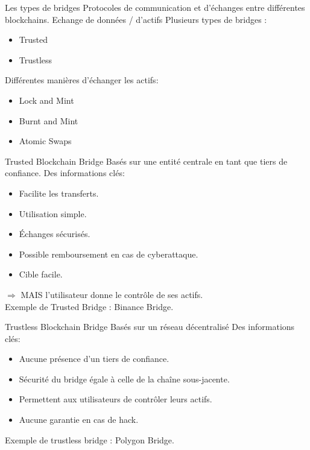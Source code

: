 \begin{frame}{Les types de bridges}
 Protocoles de communication et d'échanges entre différentes blockchains.
 Echange de données / d'actifs \newline \newline
 Plusieurs types de bridges :
 \begin{itemize}
     \item Trusted
     \item Trustless
 \end{itemize} 
 Différentes manières d'échanger les actifs:
 \begin{itemize}
     \item Lock and Mint
     \item Burnt and Mint
     \item Atomic Swaps
 \end{itemize}
\end{frame}

\begin{frame}{Trusted Blockchain Bridge}
    Basés sur une entité centrale en tant que tiers de confiance.
Des informations clés: 
    \begin{itemize}
        \item Facilite les transferts.
        \item Utilisation simple.
        \item Échanges sécurisés.
        \item Possible remboursement en cas de cyberattaque.
        \item Cible facile.
    \end{itemize}
    $\Rightarrow$ MAIS l'utilisateur donne le contrôle de ses actifs.\\ 
Exemple de Trusted Bridge : Binance Bridge.
\end{frame}

\begin{frame}{Trustless Blockchain Bridge}
Basés sur un réseau décentralisé 
Des informations clés: 
\begin{itemize}
    \item Aucune présence d'un tiers de confiance.
    \item Sécurité du bridge égale à celle de la chaîne sous-jacente.
    \item Permettent aux utilisateurs de contrôler leurs actifs.
    \item Aucune garantie en cas de hack.
\end{itemize}
Exemple de trustless bridge : Polygon Bridge.
\end{frame}

